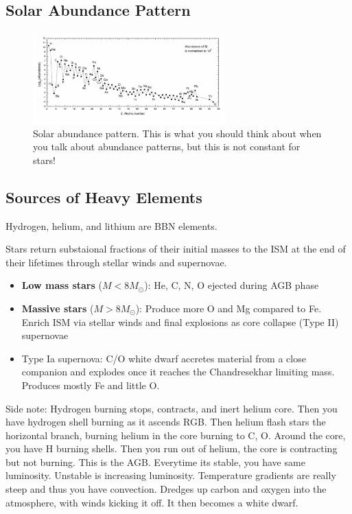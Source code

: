 \documentclass{article}
\begin{document}
\subsection{Solar Abundance Pattern}

\begin{figure}
    \centering
    \includegraphics[width=0.66\textwidth]{figs/Screen Shot 2021-10-06 at 10.01.16 AM.png}
    \caption{Solar abundance pattern. This is what you should think about when you talk about abundance patterns, but this is not constant for stars!}
    \label{fig:solar_abundance}
\end{figure}

\subsection{Sources of Heavy Elements}

Hydrogen, helium, and lithium are BBN elements.

Stars return substaional fractions of their initial masses to the ISM at the end of their lifetimes through stellar winds and supernovae.

\begin{itemize}
    \item \textbf{Low mass stars} ($M<8M_\odot$): He, C, N, O ejected during AGB phase
    \item \textbf{Massive stars} ($M>8M_\odot$): Produce more O and Mg compared to Fe. Enrich ISM via stellar winds and final explosions as core collapse (Type II) supernovae
    \item Type Ia supernova: C/O white dwarf accretes material from a close companion and explodes once it reaches the Chandresekhar limiting mass. Produces mostly Fe and little O. 
\end{itemize}

Side note: Hydrogen burning stops, contracts, and inert helium core. Then you have hydrogen shell burning as it ascends RGB. Then helium flash stars the horizontal branch, burning helium in the core burning to C, O. Around the core, you have H burning shells. Then you run out of helium, the core is contracting but not burning. This is the AGB. Everytime its stable, you have same luminosity. Unstable is increasing luminosity. Temperature gradients are really steep and thus you have convection. Dredges up carbon and oxygen into the atmosphere, with winds kicking it off. It then becomes a white dwarf.
\end{document}
